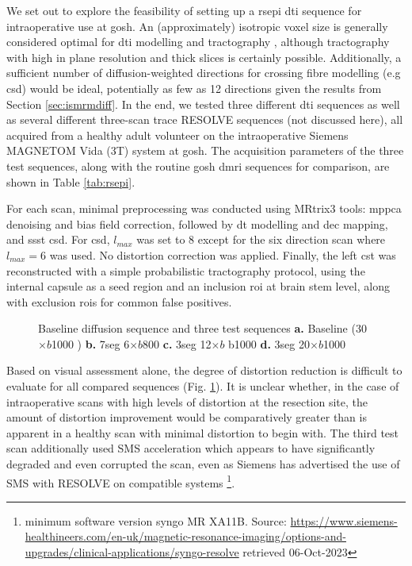 \documentclass[12pt,phd,a4paper,twoside]{ucl_thesis}
\newcommand{\x}{\nobreak\hspace{.1em minus .045em}$\times$\nobreak\hspace{.1em minus .045em}}
\providecommand{\DIFaddtex}[1]{{\protect\color{blue} \sf #1}} %
\providecommand{\DIFdeltex}[1]{{\protect\color{red} \scriptsize #1}} %
\providecommand{\DIFaddFL}[1]{\DIFadd{#1}} %
\providecommand{\DIFdelFL}[1]{\DIFdel{#1}} %
\providecommand{\DIFaddbeginFL}{} %
\providecommand{\DIFaddendFL}{} %
\providecommand{\DIFdelbeginFL}{} %
\providecommand{\DIFdelendFL}{} %
\providecommand{\DIFadd}[1]{\texorpdfstring{\DIFaddtex{#1}}{#1}} %
\providecommand{\DIFdel}[1]{\texorpdfstring{\DIFdeltex{#1}}{}} %
\newcommand{\DIFscaledelfig}{0.5}
\newlength{\DIFdelgraphicswidth} %
\newlength{\DIFdelgraphicsheight} %
\newcommand{\DIFaddincludegraphics}[2][]{{\color{blue}\fbox{\DIFOincludegraphics[#1]{#2}}}} %
\newcommand{\DIFdelincludegraphics}[2][]{%
\sbox{\DIFdelgraphicsbox}{\DIFOincludegraphics[#1]{#2}}%
\settoboxwidth{\DIFdelgraphicswidth}{\DIFdelgraphicsbox} %
\settoboxtotalheight{\DIFdelgraphicsheight}{\DIFdelgraphicsbox} %
\scalebox{\DIFscaledelfig}{%
\parbox[b]{\DIFdelgraphicswidth}{\usebox{\DIFdelgraphicsbox}\\[-\baselineskip] \rule{\DIFdelgraphicswidth}{0em}}\llap{\resizebox{\DIFdelgraphicswidth}{\DIFdelgraphicsheight}{%
\setlength{\unitlength}{\DIFdelgraphicswidth}%
\begin{picture}(1,1)%
\thicklines\linethickness{2pt} %
{\color[rgb]{1,0,0}\put(0,0){\framebox(1,1){}}}%
{\color[rgb]{1,0,0}\put(0,0){\line( 1,1){1}}}%
{\color[rgb]{1,0,0}\put(0,1){\line(1,-1){1}}}%
\end{picture}%
}\hspace*{3pt}}} %
} %
\DeclareRobustCommand{\DIFaddbeginFL}{\DIFOaddbeginFL \let\includegraphics\DIFaddincludegraphics} %
\DeclareRobustCommand{\DIFaddendFL}{\DIFOaddendFL \let\includegraphics\DIFOincludegraphics} %
\DeclareRobustCommand{\DIFdelbeginFL}{\DIFOdelbeginFL \let\includegraphics\DIFdelincludegraphics} %
\DeclareRobustCommand{\DIFdelendFL}{\DIFOaddendFL \let\includegraphics\DIFOincludegraphics} %
\begin{document}
We set out to explore the feasibility of setting up a \gls{rsepi} \gls{dti} sequence for intraoperative use at \gls{gosh}.
An (approximately) isotropic voxel size is generally considered optimal for \gls{dti} modelling and tractography \autocite{Vos2011, Neher2013}, although tractography with high in plane resolution and thick slices is certainly possible.
Additionally, a sufficient number of diffusion-weighted directions for crossing fibre modelling (e.g \gls{csd}) would be ideal, potentially as few as 12 directions given the results from Section \ref{sec:ismrmdiff}.
In the end, we tested three different \gls{dti} sequences as well as several different three-scan trace RESOLVE sequences (not discussed here), all acquired from a healthy adult volunteer on the intraoperative Siemens MAGNETOM Vida (3T) system at \gls{gosh}.
The acquisition parameters of the three test sequences, along with the routine \gls{gosh} \gls{dmri} sequences for comparison, are shown in Table \ref{tab:rsepi}.

For each scan, minimal preprocessing was conducted using MRtrix3\autocite{Tournier2019} tools:
\Gls{mppca} denoising and bias field correction, followed by \gls{dt} modelling and \gls{dec} mapping, and \gls{ssst} \gls{csd}.
For \gls{csd}, $l_{max}$ was set to 8 except for the six direction scan where $l_{max}=6$ was used.
No distortion correction was applied.
Finally, the left \gls{cst} was reconstructed with a simple probabilistic tractography protocol, using the internal capsule as a seed region and an inclusion \gls{roi} at brain stem level, along with exclusion \glspl{roi} for common false positives.

\begin{figure}[htb!]
  \centering
  
  \caption[RS-EPI test scan results]{Baseline  diffusion sequence and three  test sequences
    \textbf{\sffamily a.} Baseline (30\x{}$b$1000  )
    \textbf{\sffamily b.} 7seg 6\x{}$b$800
    \textbf{\sffamily c.} 3seg 12\x{}$b$\DIFdelbeginFL \DIFdelFL{b1000
    }\DIFdelendFL \DIFaddbeginFL \DIFaddFL{1000
    }\DIFaddendFL \textbf{\sffamily d.} 3seg 20\x{}$b$1000}\label{fig:rsepi}
\end{figure}

Based on visual assessment alone, the degree of distortion reduction is difficult to evaluate for all compared sequences (Fig. \ref{fig:rsepi}).
It is unclear whether, in the case of intraoperative scans with high levels of distortion at the resection site, the amount of distortion improvement would be comparatively greater than is apparent in a healthy scan with minimal distortion to begin with.
The third test scan additionally used SMS acceleration which appears to have significantly degraded and even corrupted the scan, even as Siemens has advertised the use of SMS with RESOLVE on compatible systems
\footnote[2]{minimum software version syngo MR XA11B. Source: \url{https://www.siemens-healthineers.com/en-uk/magnetic-resonance-imaging/options-and-upgrades/clinical-applications/syngo-resolve} retrieved 06-Oct-2023}.
\end{document}
